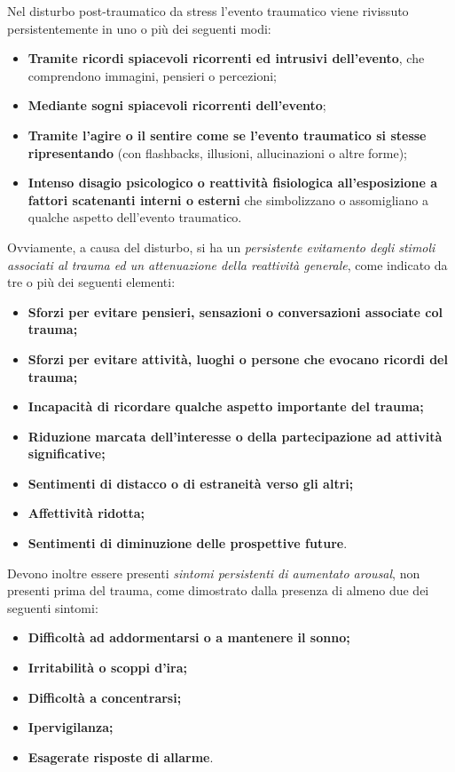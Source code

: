 \documentclass[]{article}
\begin{document}
Nel disturbo post-traumatico da stress l'evento traumatico viene
rivissuto persistentemente in uno o più dei seguenti modi:

\begin{itemize}
\item
  \textbf{Tramite ricordi spiacevoli ricorrenti ed intrusivi
  dell'evento}, che comprendono immagini, pensieri o percezioni;
\item
  \textbf{Mediante sogni spiacevoli ricorrenti dell'evento};
\item
  \textbf{Tramite l'agire o il sentire come se l'evento traumatico si
  stesse ripresentando} (con flashbacks, illusioni, allucinazioni o
  altre forme);
\item
  \textbf{Intenso disagio psicologico o reattività fisiologica
  all'esposizione a fattori scatenanti interni o esterni} che
  simbolizzano o assomigliano a qualche aspetto dell'evento traumatico.
\end{itemize}

Ovviamente, a causa del disturbo, si ha un \emph{persistente evitamento
degli stimoli associati al trauma ed un attenuazione della reattività
generale}, come indicato da tre o più dei seguenti elementi:

\begin{itemize}
\item
  \textbf{Sforzi per evitare pensieri, sensazioni o conversazioni
  associate col trauma;}
\item
  \textbf{Sforzi per evitare attività, luoghi o persone che evocano
  ricordi del trauma;}
\item
  \textbf{Incapacità di ricordare qualche aspetto importante del
  trauma;}
\item
  \textbf{Riduzione marcata dell'interesse o della partecipazione ad
  attività significative;}
\item
  \textbf{Sentimenti di distacco o di estraneità verso gli altri;}
\item
  \textbf{Affettività ridotta;}
\item
  \textbf{Sentimenti di diminuzione delle prospettive future}.
\end{itemize}

Devono inoltre essere presenti \emph{sintomi persistenti di aumentato
arousal}, non presenti prima del trauma, come dimostrato dalla presenza
di almeno due dei seguenti sintomi:

\begin{itemize}
\item
  \textbf{Difficoltà ad addormentarsi o a mantenere il sonno;}
\item
  \textbf{Irritabilità o scoppi d'ira;}
\item
  \textbf{Difficoltà a concentrarsi;}
\item
  \textbf{Ipervigilanza;}
\item
  \textbf{Esagerate risposte di allarme}.
\end{itemize}
\end{document}
